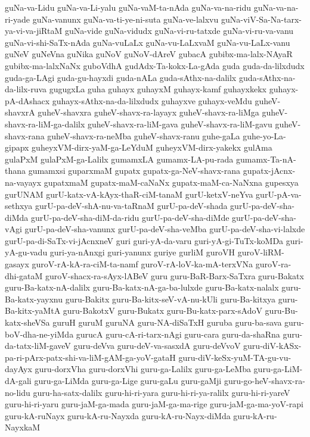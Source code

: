 {guNa-va-Lidu
guNa-va-Li-yalu
guNa-vaM-ta-nAda
guNa-va-na-ridu
guNa-va-na-ri-yade
guNa-vanunx
guNa-va-ti-ye-ni-suta
guNa-ve-lalxvu
guNa-viV-Sa-Na-tarx-ya-vi-va-jiRtaM
guNa-vide
guNa-vidudx
guNa-vi-ru-tatxde
guNa-vi-ru-va-vanu
guNa-vi-shi-SaTx-nAda
guNa-vuLaLx
guNa-vu-LaLxvaM
guNa-vu-LaLx-vanu
guNeV
guNeVna
guNika
guNoV
guNoV-dAreV
gubacA
gubibx-ma-lalx-NAyaR
gubibx-ma-lalxNaNx
guboVdhA
gudAdx-Ta-kokx-La-gAda
guda
guda-da-lilxdudx
guda-ga-LAgi
guda-gu-hayxdi
guda-nALa
guda-sAthx-na-dalilx
guda-sAthx-na-da-lilx-ruva
gugugxLa
guha
guhayx
guhayxM
guhayx-kamf
guhayxkekx
guhayx-pA-dAshacx
guhayx-sAthx-na-da-lilxdudx
guhayxve
guhayx-veMdu
guheV-shavxrA
guheV-shavxra
guheV-shavx-ra-layayx
guheV-shavx-ra-liMga
guheV-shavx-ra-liM-ga-dalilx
guheV-shavx-ra-liM-gava
guheV-shavx-ra-liM-gavu
guheV-shavx-rana
guheV-shavx-ra-neMba
guheV-shavx-ranu
guhe-gaLa
guhe-yo-La-gipapx
guheyxVM-dirx-yaM-ga-LeYduM
guheyxVM-dirx-yakekx
gulAma
gulaPxM
gulaPxM-ga-Lalilx
gumamxLA
gumamx-LA-pu-rada
gumamx-Ta-nA-thana
gumamxsi
guparxmaM
gupatx
gupatx-ga-NeV-shavx-rana
gupatx-jAcnx-na-vayayx
gupatxmaM
gupatx-maM-caNaNx
gupatx-maM-ca-NaNxna
gupesxya
gurUNAM
gurU-katx-vA-kAyx-thaR-ciM-tanaM
gurU-ketxV-neYva
gurU-pA-va-sethxya
gurU-pa-deV-shA-nu-va-taRnaM
gurU-pa-deV-shada
gurU-pa-deV-sha-diMda
gurU-pa-deV-sha-diM-da-ridu
gurU-pa-deV-sha-diMde
gurU-pa-deV-sha-vAgi
gurU-pa-deV-sha-vanunx
gurU-pa-deV-sha-veMba
gurU-pa-deV-sha-vi-lalxde
gurU-pa-di-SaTx-vi-jAcnxneV
guri
guri-yA-da-varu
guri-yA-gi-TuTx-koMDa
guri-yA-gu-vadu
guri-ya-nAnxgi
guri-yanunx
guriye
gurliM
guroVH
guroV-liRM-gasayx
guroV-rA-kA-ra-ciM-ta-namf
guroV-rA-loV-ka-mA-terxVNa
guroV-ra-dhi-gataM
guroV-shacx-ra-sAyx-lABeV
guru
guru-BaR-Barx-SaTxra
guru-Bakatx
guru-Ba-katx-nA-dalilx
guru-Ba-katx-nA-ga-ba-lulxde
guru-Ba-katx-nalalx
guru-Ba-katx-yayxnu
guru-Bakitx
guru-Ba-kitx-seV-vA-nu-kUli
guru-Ba-kitxya
guru-Ba-kitx-yaMtA
guru-BakotxV
guru-Bukatx
guru-Bu-katx-parx-sAdoV
guru-Bu-katx-sheVSa
guruH
guruM
guruNA
guru-NA-diSaTxH
guruba
guru-ba-sava
guru-boV-dha-ne-yiMda
gurucA
guru-cA-ri-tarx-nAgi
guru-cara
guru-da-shaRna
guru-da-tatx-liM-gaveV
guru-deVva
guru-deV-va-sasxdA
guru-deVvoV
guru-diV-kASx-pa-ri-pArx-patx-shi-va-liM-gAM-ga-yoV-gataH
guru-diV-keSx-yuM-TA-gu-vu-dayAyx
guru-dorxVha
guru-dorxVhi
guru-ga-Lalilx
guru-ga-LeMba
guru-ga-LiM-dA-gali
guru-ga-LiMda
guru-ga-Lige
guru-gaLu
guru-gaMji
guru-go-heV-shavx-ra-no-lidu
guru-ha-satx-dalilx
guru-hi-ri-yara
guru-hi-ri-ya-ralilx
guru-hi-ri-yareV
guru-hi-ri-yaru
guru-jaM-ga-mada
guru-jaM-ga-ma-rige
guru-jaM-ga-ma-yoV-rapi
guru-kA-ruNayx
guru-kA-ru-Nayxda
guru-kA-ru-Nayx-diMda
guru-kA-ru-NayxkaM
}
